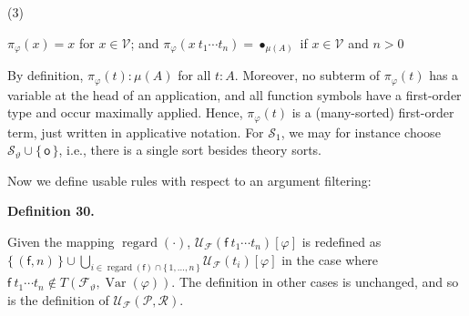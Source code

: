  
 
\par\noindent  (3) 
 
$\pi_{\varphi}(x)=x$ for $x\in\mathcal{V}$; and $\pi_{\varphi}({x}\ {{t}_{1}\cdots{t}_{n}})=\bullet_{\mu(A)}$ if $x\in\mathcal{V}$ and $n>0$\par
 
 
  
 
 
 
By definition, $\pi_{\varphi}(t):\mu(A)$ for all $t:A$. Moreover, no subterm of $\pi_{\varphi}(t)$ has a variable at the head of an application, and all function symbols have a first-order type and occur maximally applied. Hence, $\pi_{\varphi}(t)$ is a (many-sorted) first-order term, just written in applicative notation. For $\mathcal{S}_{1}$, we may for instance choose ${\mathcal{S}}_{\vartheta}\cup\{\,\mathsf{o}\,\}$, i.e., there is a single sort besides theory sorts.\par
 
 
 
Now we define usable rules with respect to an argument filtering:\par
 
 
 
\par\medskip\noindent\textbf{Definition 30.}\par
 
 
Given the mapping $\operatorname{regard}(\cdot)$, $\mathcal{U}_{\mathcal{F}}({\mathsf{f}}\ {{t}_{1}\cdots{t}_{n}})[\varphi]$ is redefined as $\{\,(\mathsf{f},n)\,\}\cup\bigcup_{i\in\operatorname{regard}(\mathsf{f})\cap\{\,1,\ldots,n\,\}}\mathcal{U}_{\mathcal{F}}(t_{i})[\varphi]$ in the case where ${\mathsf{f}}\ {{t}_{1}\cdots{t}_{n}}\notin T({\mathcal{F}}_{\vartheta},\operatorname{Var}(\varphi))$. The definition in other cases is unchanged, and so is the definition of $\mathcal{U}_{\mathcal{F}}(\mathcal{P},\mathcal{R})$.\par
 
 
 
